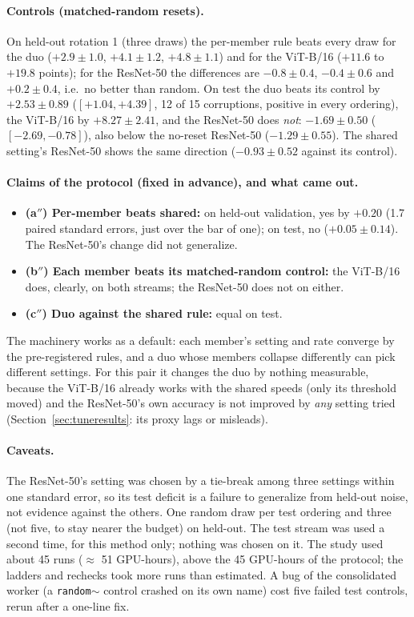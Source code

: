 \documentclass[10pt]{article}
\newcommand{\rl}[1]{\texttt{#1}}
\newcommand{\vit}{ViT-B/16}
\newcommand{\rn}{ResNet-50}
\begin{document}
\paragraph{Controls (matched-random resets).} On held-out rotation 1 (three draws) the per-member rule beats every draw for the duo ($+2.9 \pm 1.0$, $+4.1 \pm 1.2$, $+4.8 \pm 1.1$) and for the \vit{} ($+11.6$ to $+19.8$ points); for the \rn{} the differences are $-0.8 \pm 0.4$, $-0.4 \pm 0.6$ and $+0.2 \pm 0.4$, i.e.\ no better than random. On test the duo beats its control by $+2.53 \pm 0.89$ ($[+1.04, +4.39]$, 12 of 15 corruptions, positive in every ordering), the \vit{} by $+8.27 \pm 2.41$, and the \rn{} does \emph{not}: $-1.69 \pm 0.50$ ($[-2.69, -0.78]$), also below the no-reset \rn{} ($-1.29 \pm 0.55$). The shared setting's \rn{} shows the same direction ($-0.93 \pm 0.52$ against its control).

\paragraph{Claims of the protocol (fixed in advance), and what came out.}
\begin{itemize}
  \item \textbf{(a$''$) Per-member beats shared:} on held-out validation, yes by $+0.20$ (1.7 paired standard errors, just over the bar of one); on test, no ($+0.05 \pm 0.14$). The \rn{}'s change did not generalize.
  \item \textbf{(b$''$) Each member beats its matched-random control:} the \vit{} does, clearly, on both streams; the \rn{} does not on either.
  \item \textbf{(c$''$) Duo against the shared rule:} equal on test.
\end{itemize}
The machinery works as a default: each member's setting and rate converge by the pre-registered rules, and a duo whose members collapse differently can pick different settings. For this pair it changes the duo by nothing measurable, because the \vit{} already works with the shared speeds (only its threshold moved) and the \rn{}'s own accuracy is not improved by \emph{any} setting tried (Section~\ref{sec:tuneresults}: its proxy lags or misleads).

\paragraph{Caveats.} The \rn{}'s setting was chosen by a tie-break among three settings within one standard error, so its test deficit is a failure to generalize from held-out noise, not evidence against the others. One random draw per test ordering and three (not five, to stay nearer the budget) on held-out. The test stream was used a second time, for this method only; nothing was chosen on it. The study used about 45 runs ($\approx$ 51 GPU-hours), above the 45 GPU-hours of the protocol; the ladders and rechecks took more runs than estimated. A bug of the consolidated worker (a \rl{random$\sim$} control crashed on its own name) cost five failed test controls, rerun after a one-line fix.
\end{document}
